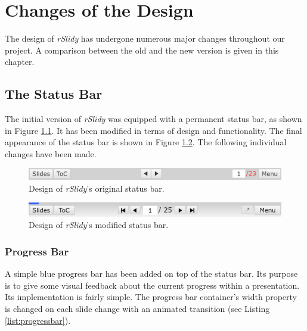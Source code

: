 %
%
% 
% 
% 


\chapter{Changes of the Design}

\label{chap:design}

The design of \textit{rSlidy} has undergone numerous major changes throughout 
our project. A comparison between the old and the new version is given in this 
chapter.

\section{The Status Bar}
The initial version of \textit{rSlidy} was equipped with a permanent status 
bar, as shown in Figure \ref{fig:statusbarOLD}. It has been modified in terms 
of design and functionality. The final appearance of the status bar is shown in 
 Figure \ref{fig:statusbarNEW}. The following individual changes have been made.

\begin{figure}[tp]
	\centering
	\includegraphics[width = \textwidth]{images/status_bar_old.png}
	
	\caption[Original Status Bar]{
		Design of \textit{rSlidy}'s original status bar.
	}
	\label{fig:statusbarOLD}
\end{figure}

\begin{figure}[tp]
	\centering
	\includegraphics[width = \textwidth]{images/status_bar_new.png}
	
	\caption[Modified Status Bar]{
		Design of \textit{rSlidy}'s modified status bar.
	}
	\label{fig:statusbarNEW}
\end{figure}


\subsection{Progress Bar}
A simple blue progress bar has been added on top of the status bar. Its purpose 
is to give some visual feedback about the current progress within a 
presentation. Its implementation is fairly simple. The progress bar container's 
width property is changed on each slide change with an animated transition (see 
Listing \ref{list:progressbar}).


